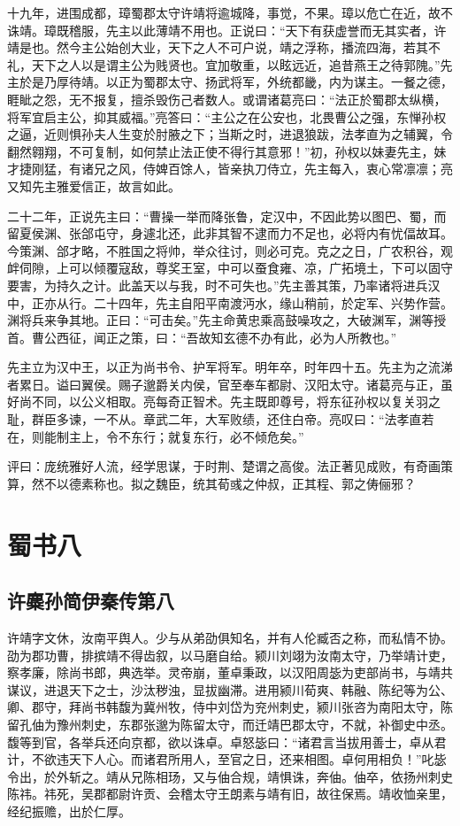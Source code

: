 \documentclass[12pt,UTF8]{ctexbook}
\begin{document}
十九年，进围成都，璋蜀郡太守许靖将逾城降，事觉，不果。璋以危亡在近，故不诛靖。璋既稽服，先主以此薄靖不用也。正说曰：“天下有获虚誉而无其实者，许靖是也。然今主公始创大业，天下之人不可户说，靖之浮称，播流四海，若其不礼，天下之人以是谓主公为贱贤也。宜加敬重，以眩远近，追昔燕王之待郭隗。”先主於是乃厚待靖。以正为蜀郡太守、扬武将军，外统都畿，内为谋主。一餐之德，睚眦之怨，无不报复，擅杀毁伤己者数人。或谓诸葛亮曰：“法正於蜀郡太纵横，将军宜启主公，抑其威福。”亮答曰：“主公之在公安也，北畏曹公之强，东惮孙权之逼，近则惧孙夫人生变於肘腋之下；当斯之时，进退狼跋，法孝直为之辅翼，令翻然翱翔，不可复制，如何禁止法正使不得行其意邪！”初，孙权以妹妻先主，妹才捷刚猛，有诸兄之风，侍婢百馀人，皆亲执刀侍立，先主每入，衷心常凛凛；亮又知先主雅爱信正，故言如此。

二十二年，正说先主曰：“曹操一举而降张鲁，定汉中，不因此势以图巴、蜀，而留夏侯渊、张郃屯守，身遽北还，此非其智不逮而力不足也，必将内有忧偪故耳。今策渊、郃才略，不胜国之将帅，举众往讨，则必可克。克之之日，广农积谷，观衅伺隙，上可以倾覆寇敌，尊奖王室，中可以蚕食雍、凉，广拓境土，下可以固守要害，为持久之计。此盖天以与我，时不可失也。”先主善其策，乃率诸将进兵汉中，正亦从行。二十四年，先主自阳平南渡沔水，缘山稍前，於定军、兴势作营。渊将兵来争其地。正曰：“可击矣。”先主命黄忠乘高鼓噪攻之，大破渊军，渊等授首。曹公西征，闻正之策，曰：“吾故知玄德不办有此，必为人所教也。”

先主立为汉中王，以正为尚书令、护军将军。明年卒，时年四十五。先主为之流涕者累日。谥曰翼侯。赐子邈爵关内侯，官至奉车都尉、汉阳太守。诸葛亮与正，虽好尚不同，以公义相取。亮每奇正智术。先主既即尊号，将东征孙权以复关羽之耻，群臣多谏，一不从。章武二年，大军败绩，还住白帝。亮叹曰：“法孝直若在，则能制主上，令不东行；就复东行，必不倾危矣。”

评曰：庞统雅好人流，经学思谋，于时荆、楚谓之高俊。法正著见成败，有奇画策算，然不以德素称也。拟之魏臣，统其荀彧之仲叔，正其程、郭之俦俪邪？

\part{蜀书八}
\chapter{许麋孙简伊秦传第八}

许靖字文休，汝南平舆人。少与从弟劭俱知名，并有人伦臧否之称，而私情不协。劭为郡功曹，排摈靖不得齿叙，以马磨自给。颍川刘翊为汝南太守，乃举靖计吏，察孝廉，除尚书郎，典选举。灵帝崩，董卓秉政，以汉阳周毖为吏部尚书，与靖共谋议，进退天下之士，沙汰秽浊，显拔幽滞。进用颍川荀爽、韩融、陈纪等为公、卿、郡守，拜尚书韩馥为冀州牧，侍中刘岱为兖州刺史，颍川张咨为南阳太守，陈留孔伷为豫州刺史，东郡张邈为陈留太守，而迁靖巴郡太守，不就，补御史中丞。馥等到官，各举兵还向京都，欲以诛卓。卓怒毖曰：“诸君言当拔用善士，卓从君计，不欲违天下人心。而诸君所用人，至官之日，还来相图。卓何用相负！”叱毖令出，於外斩之。靖从兄陈相玚，又与伷合规，靖惧诛，奔伷。伷卒，依扬州刺史陈祎。祎死，吴郡都尉许贡、会稽太守王朗素与靖有旧，故往保焉。靖收恤亲里，经纪振赡，出於仁厚。
\end{document}
